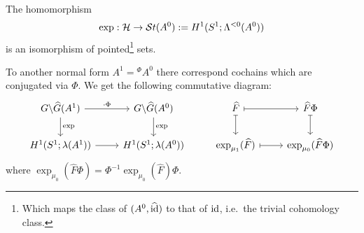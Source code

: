 \begin{tthm} \label{thm:mainThm1}
  The homomorphism
  \[
    \exp:\mathcal{H}\to\mathcal{S}{}t(A^0):=H^1(S^1;\Lambda^{<0}(A^0))
  \]
  is an isomorphism of pointed\footnote{Which maps the class of
  $(A^0,\widehat{\operatorname{id}})$ to that of $\operatorname{id}$, i.e.\ the trivial cohomology class.} sets.
\end{tthm}
\begin{rem}
  To another normal form $A^1={}^\Phi\!A^0$ there correspond cochains which
  are conjugated via $\Phi$.
  We get the following commutative diagram:
  \[ \begin{tikzcd}
      G\backslash\hat G(A^1) \rar{\cdot\Phi}\dar{\exp}
      & G\backslash\hat G(A^0) \dar{\exp}
      & \hat F \arrow[|->]{r}\arrow[|->]{d}
      & \hat F\Phi \arrow[|->]{d}
    \\ H^1(S^1;\lambda(A^1)) \rar
      & H^1(S^1;\lambda(A^0))
      & \exp_{\mu_1}(\hat F) \arrow[|->]{r}
      & \exp_{\mu_0}(\hat F\Phi)
  \end{tikzcd} \]
  where $\exp_{\mu_0}(\hat F\Phi)=\Phi^{-1}\exp_{\mu_0}(\hat F)\Phi$.
\end{rem}

